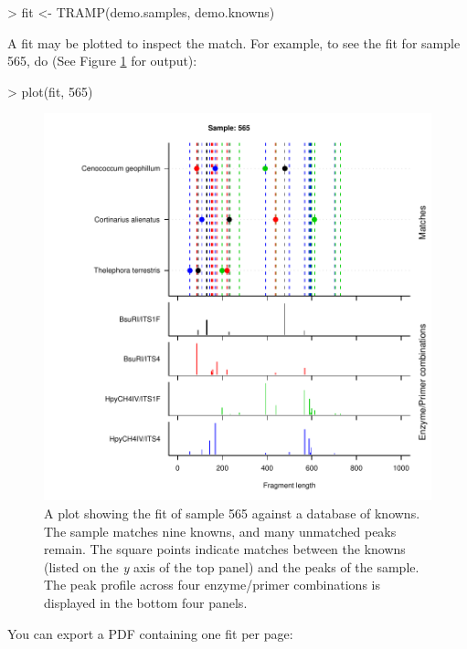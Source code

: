 \documentclass[a4paper]{article}
\begin{document}
\begin{Schunk}
\begin{Sinput}
> fit <- TRAMP(demo.samples, demo.knowns)
\end{Sinput}
\end{Schunk}

A fit may be plotted to inspect the match.  For example, to see the
fit for sample 565, do (See Figure \ref{fig:plot-565} for output):

\begin{Schunk}
\begin{Sinput}
> plot(fit, 565)
\end{Sinput}
\end{Schunk}

\begin{figure}
  \centering
\includegraphics{TRAMPRdemo-015}
\caption{A plot showing the fit of sample 565 against a database of
  knowns.  The sample matches nine knowns, and many unmatched peaks
  remain.  The square points indicate matches between the knowns
  (listed on the \textit{y} axis of the top panel) and the peaks of
  the sample.  The peak profile across four enzyme/primer combinations
  is displayed in the bottom four panels.}
\label{fig:plot-565}
\end{figure}


You can export a PDF containing one fit per page:
\end{document}
